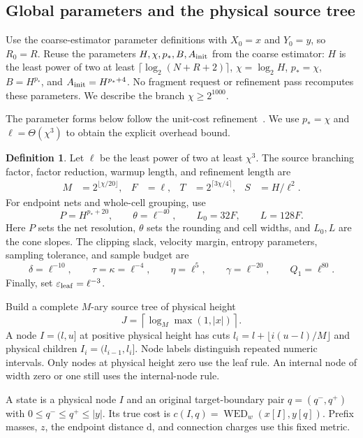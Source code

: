 \documentclass[11pt]{article}
\theoremstyle{definition}
\newtheorem{definition}[theorem]{Definition}
\newcommand{\WED}{\operatorname{WED}}
\newcommand{\dd}{\mathrm d}
\newcommand{\1}{\mathbf 1}
\begin{document}
\subsection{Global parameters and the physical source tree}

Use the coarse-estimator parameter definitions with $X_0=x$ and $Y_0=y$,
so $R_0=R$. Reuse the
parameters $H,\chi,p_*,B,A_{\rm init}$ from the coarse estimator:
$H$ is the least power of two at least
$\lceil\log_2(N+R+2)\rceil$, $\chi=\log_2H$, $p_*=\chi$,
$B=H^{p_*}$, and $A_{\rm init}=H^{p_*+4}$. No fragment request or
refinement pass recomputes these parameters. We describe the branch
$\chi\ge2^{1000}$.

The parameter forms below follow the unit-cost refinement~\cite{openai}.
We use $p_*=\chi$ and $\ell=\Theta(\chi^3)$ to obtain the explicit
overhead bound.

\begin{definition}\label{refine:def:parameters}
Let $\ell$ be the least power of two at least $\chi^3$.
The source branching factor, factor reduction, warmup length, and
refinement length are
\begin{align*}
 M&=2^{\lfloor\chi/20\rfloor},& F&=\ell,&
 T&=2^{\lceil3\chi/4\rceil},& S&=H/\ell^2.
\end{align*}
For endpoint nets and whole-cell grouping, use
\[
 P=H^{p_*+20},\qquad \theta=\ell^{-40},\qquad
 L_0=32F,\qquad L=128F.
\]
Here $P$ sets the net resolution, $\theta$ sets the rounding and cell
widths, and $L_0,L$ are the cone slopes.
The clipping slack, velocity margin, entropy parameters, sampling
tolerance, and sample budget are
\[
 \delta=\ell^{-10},\qquad \tau=\kappa=\ell^{-4},\qquad
 \eta=\ell^5,\qquad \gamma=\ell^{-20},\qquad Q_1=\ell^{80}.
\]
Finally, set $\varepsilon_{\rm leaf}=\ell^{-3}$.

Build a complete $M$-ary source tree of physical height
\[
 J=\left\lceil\log_M\max(1,|x|)\right\rceil.
\]
A node $I=(l,u]$ at positive physical height has cuts
$l_i=l+\lfloor i(u-l)/M\rfloor$ and physical children
$I_i=(l_{i-1},l_i]$. Node labels distinguish repeated numeric intervals.
Only nodes at physical height zero use the leaf rule. An internal node
of width zero or one still uses the internal-node rule.

A state is a physical node $I$ and an original target-boundary pair
$q=(q^-,q^+)$ with $0\le q^-\le q^+\le|y|$. Its true cost is
$c(I,q)=\WED_w(x[I],y[q])$. Prefix masses, $z$, the endpoint distance
$\dd$, and connection charges use this fixed metric.
\end{definition}
\end{document}
